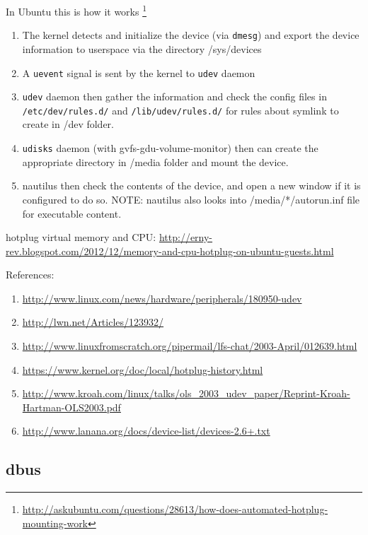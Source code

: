 In Ubuntu this is how it works
\footnote{\url{http://askubuntu.com/questions/28613/how-does-automated-hotplug-mounting-work}}
\begin{enumerate}
  \item The kernel detects and initialize the device (via \verb!dmesg!) and
  export the device information to userspace via the directory /sys/devices
  \item A \verb!uevent! signal is sent by the kernel to \verb!udev! daemon
  \item \verb!udev! daemon then gather the information and check the config
  files in \verb!/etc/dev/rules.d/! and \verb!/lib/udev/rules.d/! for rules
  about symlink to create in /dev folder. 
  
  \item \verb!udisks! daemon (with gvfs-gdu-volume-monitor) then can create the
  appropriate directory in /media folder and mount the device.
  \item nautilus then check the contents of the device, and open a new window if
  it is configured to do so. NOTE: nautilus also looks into /media/*/autorun.inf
  file for executable content.
   
\end{enumerate}

hotplug virtual memory and CPU:
\url{http://erny-rev.blogspot.com/2012/12/memory-and-cpu-hotplug-on-ubuntu-guests.html}

References:
\begin{enumerate}
  \item  \url{http://www.linux.com/news/hardware/peripherals/180950-udev}

  \item \url{http://lwn.net/Articles/123932/}
  
  \item
  \url{http://www.linuxfromscratch.org/pipermail/lfs-chat/2003-April/012639.html}
  
  \item \url{https://www.kernel.org/doc/local/hotplug-history.html}
  
  \item
  \url{http://www.kroah.com/linux/talks/ols_2003_udev_paper/Reprint-Kroah-Hartman-OLS2003.pdf}
  
  \item \url{http://www.lanana.org/docs/device-list/devices-2.6+.txt}
\end{enumerate}

\subsection{dbus}	
\label{sec:dbus}

